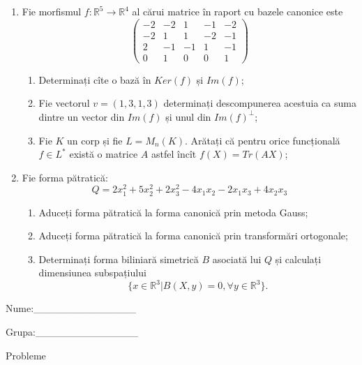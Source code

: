 \documentclass{article}
\begin{document}
\begin{enumerate}
 \item Fie morfismul $f:\mathbb{R}^5 \to \mathbb{R}^4$ al cărui matrice în raport cu bazele canonice este
$$\begin{pmatrix}
-2&-2&1&-1&-2\\
-2&1&1&-2&-1\\
2&-1&-1&1&-1\\
0&1&0&0&1
\end{pmatrix}$$

\begin{enumerate}
\item Determinați cîte o bază în $Ker(f)$ și $Im(f)$;
\item Fie vectorul $v=(1,3,1,3)$ determinați descompunerea acestuia ca suma dintre un vector din $Im(f)$ și unul din $Im(f)^\perp$;
\item Fie $K$ un corp și fie $L=M_n(K)$. Arătați că pentru orice funcțională $f \in L^*$ există o matrice $A$ astfel încît $f(X)=Tr(AX)$;
\end{enumerate}
\item Fie forma pătratică:
$$Q= 2x_1^2+5x_2^2+2x_3^2-4x_1x_2-2x_1x_3+4x_2x_3$$

\begin{enumerate}
\item Aduceți forma pătratică la forma canonică prin metoda Gauss;
\item Aduceți forma pătratică la forma canonică prin transformări ortogonale;
\item Determinați forma biliniară simetrică $B$ asociată lui $Q$ și calculați dimensiunea subspațiului
$$\{x \in \mathbb{R}^3 | B(X,y)=0,\forall y \in \mathbb{R}^3\}.$$

\end{enumerate}
\end{enumerate}
\newpage
\begin{flushright}
Nume:\_\_\_\_\_\_\_\_\_\_\_\_\_\_
 
 
Grupa:\_\_\_\_\_\_\_\_\_\_\_\_\_\_
\end{flushright}
\begin{center}
\vspace{2cm}
{\Large Probleme}
\vspace{2cm}
\end{center}
\end{document}
